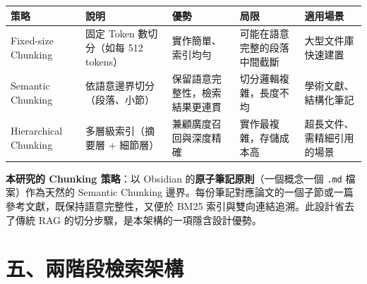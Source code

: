 {\def\LTcaptype{none} %
\begin{longtable}[]{@{}
  >{\raggedright\arraybackslash}p{}
  >{\raggedright\arraybackslash}p{}
  >{\raggedright\arraybackslash}p{}
  >{\raggedright\arraybackslash}p{}
  >{\raggedright\arraybackslash}p{}@{}}
\toprule\noalign{}
\begin{minipage}[b]{\linewidth}\raggedright
策略
\end{minipage} & \begin{minipage}[b]{\linewidth}\raggedright
說明
\end{minipage} & \begin{minipage}[b]{\linewidth}\raggedright
優勢
\end{minipage} & \begin{minipage}[b]{\linewidth}\raggedright
局限
\end{minipage} & \begin{minipage}[b]{\linewidth}\raggedright
適用場景
\end{minipage} \\
\midrule\noalign{}
\endhead
\bottomrule\noalign{}
\endlastfoot
Fixed-size Chunking & 固定 Token 數切分（如每 512 tokens） &
實作簡單、索引均勻 & 可能在語意完整的段落中間截斷 &
大型文件庫快速建置 \\
Semantic Chunking & 依語意邊界切分（段落、小節） &
保留語意完整性，檢索結果更連貫 & 切分邏輯複雜，長度不均 &
學術文獻、結構化筆記 \\
Hierarchical Chunking & 多層級索引（摘要層 + 細節層） &
兼顧廣度召回與深度精確 & 實作最複雜，存儲成本高 &
超長文件、需精細引用的場景 \\
\end{longtable}
}

\textbf{本研究的 Chunking 策略}：以 Obsidian
的\textbf{原子筆記原則}（一個概念一個 \texttt{.md} 檔案）作為天然的
Semantic Chunking
邊界。每份筆記對應論文的一個子節或一篇參考文獻，既保持語意完整性，又便於
BM25 索引與雙向連結追溯。此設計省去了傳統 RAG
的切分步驟，是本架構的一項隱含設計優勢。

\section{五、兩階段檢索架構}\label{ux4e94ux5169ux968eux6bb5ux6aa2ux7d22ux67b6ux69cb}

